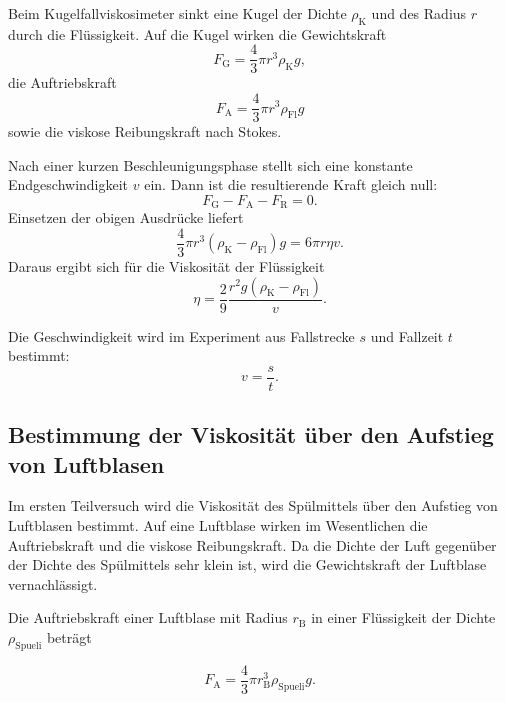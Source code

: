 \documentclass{report}
\begin{document}
Beim Kugelfallviskosimeter sinkt eine Kugel der Dichte $\rho_\mathrm{K}$ und des Radius $r$
durch die Flüssigkeit. Auf die Kugel wirken die Gewichtskraft
\begin{equation}
    F_\mathrm{G} = \frac{4}{3}\pi r^3 \rho_\mathrm{K} g,
\end{equation}
die Auftriebskraft
\begin{equation}
    F_\mathrm{A} = \frac{4}{3}\pi r^3 \rho_\mathrm{Fl} g
\end{equation}
sowie die viskose Reibungskraft nach Stokes.

\noindent
Nach einer kurzen Beschleunigungsphase stellt sich eine konstante Endgeschwindigkeit $v$ ein.
Dann ist die resultierende Kraft gleich null:
\begin{equation}
    F_\mathrm{G} - F_\mathrm{A} - F_\mathrm{R} = 0.
\end{equation}
Einsetzen der obigen Ausdrücke liefert
\begin{equation}
    \frac{4}{3}\pi r^3 (\rho_\mathrm{K} - \rho_\mathrm{Fl}) g
    = 6 \pi r \eta v.
\end{equation}
Daraus ergibt sich für die Viskosität der Flüssigkeit
\begin{equation}
    \eta = \frac{2}{9} \frac{r^2 g (\rho_\mathrm{K} - \rho_\mathrm{Fl})}{v}.
\end{equation}

\noindent
Die Geschwindigkeit wird im Experiment aus Fallstrecke $s$ und Fallzeit $t$ bestimmt:
\begin{equation}
    v = \frac{s}{t}.
\end{equation}

\subsection{Bestimmung der Viskosität über den Aufstieg von Luftblasen}

Im ersten Teilversuch wird die Viskosität des Spülmittels über den Aufstieg von Luftblasen
bestimmt. Auf eine Luftblase wirken im Wesentlichen die Auftriebskraft und die viskose
Reibungskraft. Da die Dichte der Luft gegenüber der Dichte des Spülmittels sehr klein ist,
wird die Gewichtskraft der Luftblase vernachlässigt.

\noindent
Die Auftriebskraft einer Luftblase mit Radius $r_\mathrm{B}$ in einer Flüssigkeit der Dichte
$\rho_\mathrm{Spueli}$ beträgt

\begin{equation}
    F_\mathrm{A} = \frac{4}{3}\pi r_\mathrm{B}^3 \rho_\mathrm{Spueli} g.
\end{equation}
\end{document}
